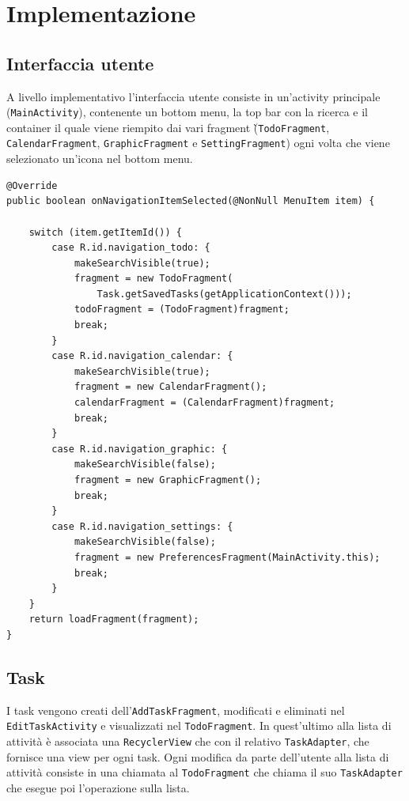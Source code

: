 \documentclass[]{article}
\begin{document}
\hypertarget{implementazione}{%
\section{Implementazione}\label{implementazione}}

\hypertarget{interfaccia-utente}{%
\subsection{Interfaccia utente}\label{interfaccia-utente}}

A livello implementativo l'interfaccia utente consiste in un'activity
principale (\texttt{MainActivity}), contenente un bottom menu, la top
bar con la ricerca e il container il quale viene riempito dai vari
fragment (̀\texttt{TodoFragment}, \texttt{CalendarFragment},
\texttt{GraphicFragment} e \texttt{SettingFragment}) ogni volta che
viene selezionato un'icona nel bottom menu.

\begin{verbatim}
@Override
public boolean onNavigationItemSelected(@NonNull MenuItem item) {

    switch (item.getItemId()) {
        case R.id.navigation_todo: {
            makeSearchVisible(true);
            fragment = new TodoFragment(
                Task.getSavedTasks(getApplicationContext()));
            todoFragment = (TodoFragment)fragment;
            break;
        }
        case R.id.navigation_calendar: {
            makeSearchVisible(true);
            fragment = new CalendarFragment();
            calendarFragment = (CalendarFragment)fragment;
            break;
        }
        case R.id.navigation_graphic: {
            makeSearchVisible(false);
            fragment = new GraphicFragment();
            break;
        }
        case R.id.navigation_settings: {
            makeSearchVisible(false);
            fragment = new PreferencesFragment(MainActivity.this);
            break;
        }
    }
    return loadFragment(fragment);
}
\end{verbatim}

\hypertarget{task}{%
\subsection{Task}\label{task}}

I task vengono creati dell'\texttt{AddTaskFragment}, modificati e
eliminati nel \texttt{EditTaskActivity} e visualizzati nel
\texttt{TodoFragment}. In quest'ultimo alla lista di attività è
associata una \texttt{RecyclerView} che con il relativo
\texttt{TaskAdapter}, che fornisce una view per ogni task. Ogni modifica
da parte dell'utente alla lista di attività consiste in una chiamata al
\texttt{TodoFragment} che chiama il suo \texttt{TaskAdapter} che esegue
poi l'operazione sulla lista.
\end{document}
